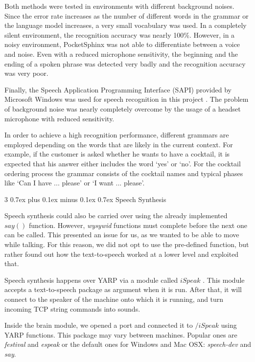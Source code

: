 \documentclass[conference]{IEEEtran}
\makeatletter
\def\subsubsection{\@startsection{subsubsection}%
	{3}%
	{\z@}%
	{0.7ex plus 0.1ex minus 0.1ex}%
	{0.7ex}%
	{\normalfont\normalsize\itshape}}%
\makeatother
\begin{document}
Both methods were tested in environments with different background noises. 
Since the error rate increases as the number of different words in the grammar or the language model increases, a very small vocabulary was used. In a completely silent environment, the recognition accuracy was nearly 100\%. However, in a noisy environment, PocketSphinx was not able to differentiate between a voice and noise. Even with a reduced microphone sensitivity, the beginning and the ending of a spoken phrase was detected very badly and the recognition accuracy was very poor.

Finally, the Speech Application Programming Interface (SAPI) provided by Microsoft Windows was used for speech recognition in this project \cite{SAPI}. The problem of background noise was nearly completely overcome by the usage of a headset microphone with reduced sensitivity.

In order to achieve a high recognition performance, different grammars are employed depending on the words that are likely in the current context. For example, if the customer is asked whether he wants to have a cocktail, it is expected that his answer either includes the word `yes' or `no'. For the cocktail ordering process the grammar consists of the cocktail names and typical phases like `Can I have ... please' or `I want ... please'.

\subsubsection{Speech Synthesis}

Speech synthesis could also be carried over using the already implemented $say()$ function. However, \textit{wysywid} functions must complete before the next one can be called. This presented an issue for us, as we wanted to be able to move while talking. For this reason, we did not opt to use the pre-defined function, but rather found out how the text-to-speech worked at a lower level and exploited that. 

Speech synthesis happens over YARP via a module called $iSpeak$ \cite{gitspeech}. This module accepts a text-to-speech package as argument when it is run. After that, it will connect to the speaker of the machine onto which it is running, and turn incoming TCP string commands into sounds. 

Inside the brain module, we opened a port and connected it to $/iSpeak$ using YARP functions. This package may vary between machines. Popular ones are \emph{festival} and \emph{espeak} or the default ones for Windows and Mac OSX: \emph{speech-dev} and \emph{say}. 
\end{document}
